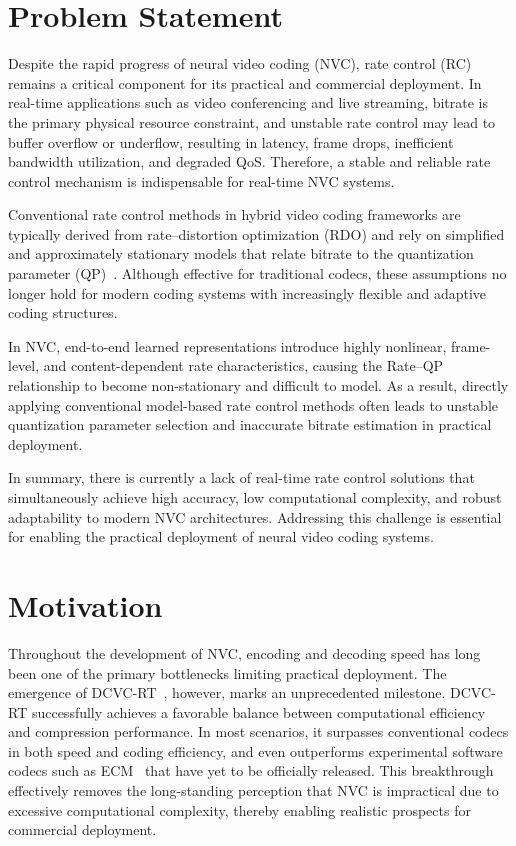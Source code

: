 \section{Problem Statement}
Despite the rapid progress of neural video coding (NVC), rate control (RC) remains a critical component for its practical and commercial deployment. In real-time applications such as video conferencing and live streaming, bitrate is the primary physical resource constraint, and unstable rate control may lead to buffer overflow or underflow, resulting in latency, frame drops, inefficient bandwidth utilization, and degraded QoS. Therefore, a stable and reliable rate control mechanism is indispensable for real-time NVC systems.

Conventional rate control methods in hybrid video coding frameworks are typically derived from rate–distortion optimization (RDO) and rely on simplified and approximately stationary models that relate bitrate to the quantization parameter (QP)~\cite{50}. Although effective for traditional codecs, these assumptions no longer hold for modern coding systems with increasingly flexible and adaptive coding structures.

In NVC, end-to-end learned representations introduce highly nonlinear, frame-level, and content-dependent rate characteristics, causing the Rate–QP relationship to become non-stationary and difficult to model. As a result, directly applying conventional model-based rate control methods often leads to unstable quantization parameter selection and inaccurate bitrate estimation in practical deployment.

In summary, there is currently a lack of real-time rate control solutions that simultaneously achieve high accuracy, low computational complexity, and robust adaptability to modern NVC architectures. Addressing this challenge is essential for enabling the practical deployment of neural video coding systems.

\section{Motivation}
Throughout the development of NVC, encoding and decoding speed has long been one of the primary bottlenecks limiting practical deployment. The emergence of DCVC-RT~\cite{01}, however, marks an unprecedented milestone. DCVC-RT successfully achieves a favorable balance between computational efficiency and compression performance. In most scenarios, it surpasses conventional codecs in both speed and coding efficiency, and even outperforms experimental software codecs such as ECM~\cite{ECM} that have yet to be officially released. This breakthrough effectively removes the long-standing perception that NVC is impractical due to excessive computational complexity, thereby enabling realistic prospects for commercial deployment.

